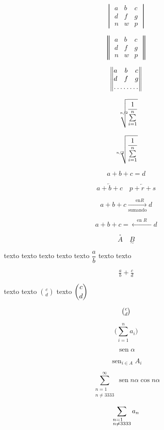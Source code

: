 \documentclass[a4paper]{report}
\numberwithin{equation}{section}
\DeclareMathOperator{\sen}{sen}
\DeclareMathOperator*{\algo}{sen}%
\theoremstyle{definition}
\theoremstyle{plain}
\theoremstyle{remark}
\begin{document}
\[ \begin{vmatrix}
a & b & c \\
d & f & g \\
n & w & p 
\end{vmatrix} \]

\[ \begin{Vmatrix}
a & b & c \\
d & f & g \\
n & w & p 
\end{Vmatrix} \]

\[ \begin{Vmatrix}
a & b & c \\
d & f & g \\
\hdotsfor{3}
\end{Vmatrix} \]

\[ \sqrt[\leftroot{-10}n/2]{\frac{1}{\sum\limits_{i=1}^{n}}} \]%

\[ \sqrt[\uproot{-10}n/2]{\frac{1}{\sum\limits_{i=1}^{n}}} \]

\[
\boxed{a+b+c=d}
\]

\[
\overleftarrow{a+b+c}\quad
\underleftarrow{p+r+s}
\]

\[
a+b+c\xrightarrow[\text{sumando}]{\quad \text{en} R}d%
\]

\[
a+b+c=\xleftarrow{\quad \text{en }R\quad}d
\]

\[
\overset{\circ}{A}\quad \underset{\sim}{B}%
\]

texto texto texto texto texto \(\dfrac{a}{b}\) texto texto 

\[
\tfrac{a}{b}+\tfrac{c}{d}
\]

texto texto \(\binom{c}{d}\) texto $\dbinom{c}{d}$

\[
\tbinom{c}{d}
\]

\[
\biggl(\sum_{i=1}^{n} a_i\bigg)%
\]



\[
\sen\alpha
\]

\[
\algo_{i\in A} A_i
\]

\[
\sum_{\substack{n=1\\n\neq 3333}}^{\infty} \sen n\alpha \cos n\alpha
\]

\[
\sum_{\begin{subarray}{l}
	n=1\\
	n\neq 3333
	\end{subarray}} a_n
\]%
\end{document}
